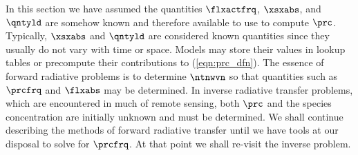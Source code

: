 \documentclass[12pt]{article}
\begin{document}
In this section we have assumed the quantities $\flxactfrq$,
$\xsxabs$, and $\qntyld$ are somehow known and therefore available to 
use to compute $\prc$.
Typically, $\xsxabs$ and $\qntyld$ are considered known quantities
since they usually do not vary with time or space.
Models may store their values in lookup tables or precompute their
contributions to (\ref{eqn:prc_dfn}).
The essence of forward radiative problems is to determine $\ntnwvn$ so  
that quantities such as $\prcfrq$ and $\flxabs$ may be determined. 
In inverse radiative transfer problems, which are encountered in much
of remote sensing, both $\prc$ and the species concentration are
initially unknown and must be determined. 
We shall continue describing the methods of forward radiative transfer
until we have tools at our disposal to solve for $\prcfrq$.
At that point we shall re-visit the inverse problem.
\end{document}

